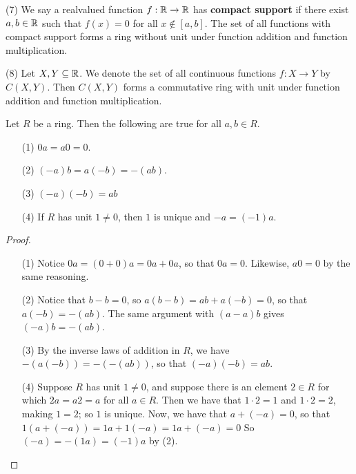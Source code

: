 \begin{example}
    \item[(7)] We say a realvalued function $f:\mathbb{R} \xrightarrow{} \mathbb{R}$ has
        \textbf{compact support} if there exist $a,b \in \mathbb{R}$ such that $f(x)=0$
        for all $x \notin [a,b]$. The set of all functions with compact support
        forms a ring without unit under function addition and function
        multiplication.

    \item[(8)] Let $X,Y \subseteq \mathbb{R}$. We denote the set of all continuous
        functions  $f:X \xrightarrow{} Y$ by $C(X,Y)$. Then $C(X,Y)$ forms a
        commutative ring with unit under function addition and function
        multiplication.
\end{example}

\begin{lemma}\label{1.1.1}
    Let $R$ be a ring. Then the following are true for all  $a,b \in R$.
    \begin{enumerate}
        \item[(1)] $0a=a0=0$.

        \item[(2)] $(-a)b=a(-b)=-(ab)$.

        \item[(3)] $(-a)(-b)=ab$

        \item[(4)] If $R$ has unit  $1 \neq 0$, then $1$ is unique and
            $-a=(-1)a$.
    \end{enumerate}
\end{lemma}
\begin{proof}
    \begin{enumerate}
        \item[(1)] Notice $0a=(0+0)a=0a+0a$, so that $0a=0$. Likewise, $a0=0$ by
            the same reasoning.

        \item[(2)] Notice that $b-b=0$, so $a(b-b)=ab+a(-b)=0$, so that
            $a(-b)=-(ab)$. The same argument with $(a-a)b$ gives $(-a)b=-(ab)$.

        \item[(3)] By the inverse laws of addition in $R$, we have
            $-(a(-b))=-(-(ab))$, so that $(-a)(-b)=ab$.

    \item[(4)] Suppose $R$ has unit $1 \neq 0$, and suppose there is an element
        $2 \in R$ for which  $2a=a2=a$ for all $a \in R$. Then we have that
        $1 \cdot 2=1$ and  $1 \cdot 2=2$, making  $1=2$; so  $1$ is unique. Now,
        we have that $a+(-a)=0$, so that $1(a+(-a))=1a+1(-a)=1a+(-a)=0$ So
        $(-a)=-(1a)=(-1)a$ by (2).
    \end{enumerate}
\end{proof}

